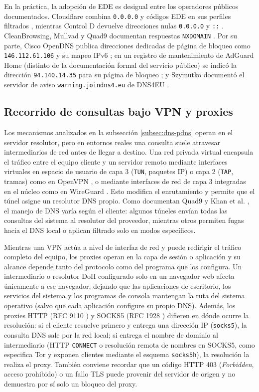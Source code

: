 \documentclass[10pt,a4paper]{article}
\begin{document}
En la práctica, la adopción de EDE es desigual entre los operadores públicos documentados. Cloudflare combina \texttt{0.0.0.0} y códigos EDE en sus perfiles filtrados \cite{cloudflare}, mientras Control D devuelve direcciones nulas \texttt{0.0.0.0} y \texttt{::} \cite{controldblock}. CleanBrowsing, Mullvad y Quad9 documentan respuestas \texttt{NXDOMAIN} \cite{cleanbrowsingverify,mullvaddns,quad9}. Por su parte, Cisco OpenDNS publica direcciones dedicadas de página de bloqueo como \texttt{146.112.61.106} y su mapeo IPv6 \cite{ciscoblock,ciscotest}; en un registro de mantenimiento de AdGuard Home (distinto de la documentación formal del servicio público) se indicó la dirección \texttt{94.140.14.35} para su página de bloqueo \cite{adguardblock}; y Szymutko documentó el servidor de aviso \texttt{warning.joindns4.eu} de DNS4EU \cite{szymutko2026}.

\subsection{Recorrido de consultas bajo VPN y proxies}

Los mecanismos analizados en la subsección \ref{subsec:dns-pdns} operan en el servidor resolutor, pero en entornos reales una consulta suele atravesar intermediarios de red antes de llegar a destino. Una red privada virtual encapsula el tráfico entre el equipo cliente y un servidor remoto mediante interfaces virtuales en espacio de usuario de capa 3 (\texttt{TUN}, paquetes IP) o capa 2 (\texttt{TAP}, tramas) como en OpenVPN \cite{openvpnmanual}, o mediante interfaces de red de capa 3 integradas en el núcleo como en WireGuard \cite{donenfeld2017wireguard}. Esto modifica el enrutamiento y permite que el túnel asigne un resolutor DNS propio. Como documentan Quad9 \cite{quad9faq} y Khan et al. \cite{khan2018vpn}, el manejo de DNS varía según el cliente: algunos túneles envían todas las consultas del sistema al resolutor del proveedor, mientras otros permiten fugas hacia el DNS local o aplican filtrado solo en modos específicos.

Mientras una VPN actúa a nivel de interfaz de red y puede redirigir el tráfico completo del equipo, los proxies operan en la capa de sesión o aplicación y su alcance depende tanto del protocolo como del programa que los configura. Un intermediario o resolutor DoH configurado solo en un navegador web afecta únicamente a ese navegador, dejando que las aplicaciones de escritorio, los servicios del sistema y los programas de consola mantengan la ruta del sistema operativo (salvo que cada aplicación configure su propio DNS). Además, los proxies HTTP (RFC 9110 \cite{rfc9110}) y SOCKS5 (RFC 1928 \cite{rfc1928}) difieren en dónde ocurre la resolución: si el cliente resuelve primero y entrega una dirección IP (\texttt{socks5}), la consulta DNS sale por la red local; si entrega el nombre de dominio al intermediario (HTTP \texttt{CONNECT} o resolución remota de nombres en SOCKS5, como especifica Tor \cite{torprotocol} y exponen clientes mediante el esquema \texttt{socks5h}), la resolución la realiza el proxy. También conviene recordar que un código HTTP 403 (\emph{Forbidden}, acceso prohibido) o un fallo TLS puede provenir del servidor de origen y no demuestra por sí solo un bloqueo del proxy.
\end{document}
